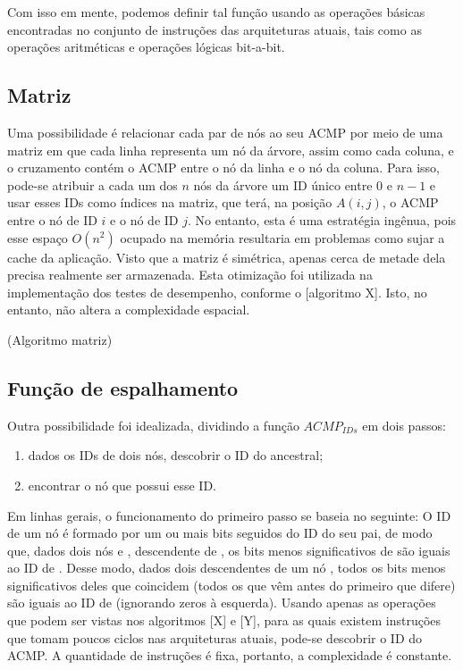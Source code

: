 Com isso em mente, podemos definir tal função usando as operações básicas encontradas no conjunto de instruções das arquiteturas atuais,
tais como as operações aritméticas e operações lógicas bit-a-bit.

\subsection{Matriz}

Uma possibilidade é relacionar cada par de nós ao seu ACMP por meio de uma matriz
em que cada linha representa um nó da árvore, assim como cada coluna, e o cruzamento contém o ACMP entre o nó da linha e o nó da coluna.
Para isso, pode-se atribuir a cada um dos $n$ nós da árvore um ID único entre $0$ e $n-1$ e usar esses IDs como índices na matriz,
que terá, na posição $A(i,j)$, o ACMP entre o nó de ID $i$ e o nó de ID $j$.
No entanto, esta é uma estratégia ingênua, pois esse espaço $O(n^2)$ ocupado na memória resultaria em problemas como sujar a cache da aplicação.
Visto que a matriz é simétrica, apenas cerca de metade dela precisa realmente ser armazenada.
Esta otimização foi utilizada na implementação dos testes de desempenho, conforme o [algoritmo X].
Isto, no entanto, não altera a complexidade espacial.

(Algoritmo matriz)

\subsection{Função de espalhamento}

Outra possibilidade foi idealizada, dividindo a função $ACMP_{IDs}$ em dois passos:
\begin{enumerate}
	\item dados os IDs de dois nós, descobrir o ID do ancestral;
	\item encontrar o nó que possui esse ID.
\end{enumerate}
Em linhas gerais, o funcionamento do primeiro passo se baseia no seguinte:
O ID de um nó é formado por um ou mais bits seguidos do ID do seu pai, de modo que, dados dois nós  e ,  descendente de ,
os bits menos significativos de  são iguais ao ID de .
Desse modo, dados dois descendentes de um nó , todos os bits menos significativos deles que coincidem
(todos os que vêm antes do primeiro que difere) são iguais ao ID de  (ignorando zeros à esquerda).
Usando apenas as operações que podem ser vistas nos algoritmos [X] e [Y],
para as quais existem instruções que tomam poucos ciclos nas arquiteturas atuais, pode-se descobrir o ID do ACMP.
A quantidade de instruções é fixa, portanto, a complexidade é constante.

